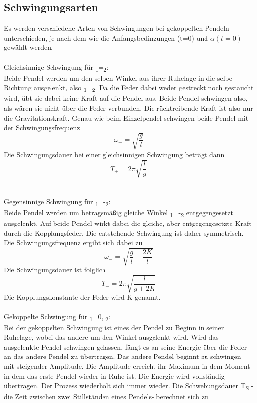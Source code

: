 \documentclass[titlepage=firstcover, captions=tableheading]{scrartcl}
\begin{document}
\subsection{Schwingungsarten}
Es werden verschiedene Arten von Schwingungen bei gekoppelten Pendeln unterschieden, je nach dem wie die Anfangsbedingungen \alpha(t=0) und $\dot{\alpha}(t=0)$ gewählt werden.\\\\
\noindent Gleichsinnige Schwingung für \alpha\textsubscript{1}=\alpha\textsubscript{2}:\\
Beide Pendel werden um den selben Winkel \alpha \; aus ihrer Ruhelage in die selbe Richtung ausgelenkt, also \alpha\textsubscript{1}=\alpha\textsubscript{2}. Da die Feder dabei weder gestreckt noch gestaucht wird, übt sie dabei keine Kraft auf die Pendel aus. Beide Pendel schwingen also, als wären sie nicht über die Feder verbunden. Die rücktreibende Kraft ist also nur die Gravitationskraft. Genau wie beim Einzelpendel schwingen beide Pendel mit der Schwingungsfrequenz
\begin{equation}\label{w+}
    \omega_+=\sqrt{\frac{g}{l}}
\end{equation}
Die Schwingungsdauer bei einer gleichsinnigen Schwingung beträgt dann 
\begin{equation}\label{T+}
    T_+ =2\pi\sqrt{\frac{l}{g}}
\end{equation}
\\\\
\noindent Gegensinnige Schwingung für \alpha\textsubscript{1}=-\alpha\textsubscript{2}:\\
Beide Pendel werden um betragsmäßig gleiche Winkel \alpha\textsubscript{1}=-\alpha\textsubscript{2} entgegengesetzt ausgelenkt. 
Auf beide Pendel wirkt dabei die gleiche, aber entgegengesetzte Kraft durch die Kopplungsfeder. Die entstehende Schwingung ist daher symmetrisch. Die Schwingungsfrequenz ergibt sich dabei zu 
\begin{equation}\label{w-}
    \omega_-=\sqrt{\frac{g}{l}+\frac{2K}{l}}
\end{equation}
Die Schwingungsdauer ist folglich
\begin{equation}\label{T-}
    T_-=2\pi\sqrt{\frac{l}{g+2K}}
\end{equation}
Die Kopplungskonstante der Feder wird K genannt.
\\\\
Gekoppelte Schwingung für \alpha\textsubscript{1}=0, \alpha\textsubscript{2}:\\
Bei der gekoppelten Schwingung ist eines der Pendel zu Beginn in seiner Ruhelage, wobei das andere um den Winkel \alpha \; ausgelenkt wird. Wird das ausgelenkte Pendel schwingen gelassen, fängt es an seine Energie über die Feder an das andere Pendel zu übertragen. Das andere Pendel beginnt zu schwingen mit steigender Amplitude. Die Amplitude erreicht ihr Maximum in dem Moment in dem das erste Pendel wieder in Ruhe ist. Die Energie wird vollständig übertragen. Der Prozess wiederholt sich immer wieder. Die Schwebungsdauer T\textsubscript{S} -die Zeit zwischen zwei Stillständen eines Pendels- berechnet sich zu 
\end{document}
